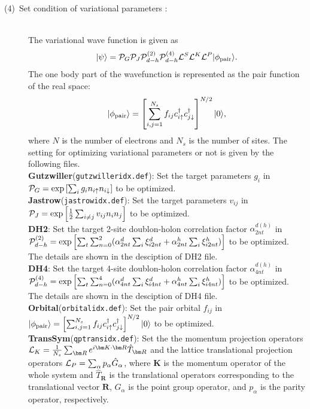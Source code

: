 \begin{description}
\item[(4)~Set condition of variational parameters :] 
~\\The variational wave function is given as
\begin{equation}
|\psi \rangle = {\cal P}_G{\cal P}_J{\cal P}_{d-h}^{(2)}{\cal P}_{d-h}^{(4)}{\cal L}^S{\cal L}^K{\cal L}^P |\phi_{\rm pair} \rangle.
\end{equation}
The one body part of the wavefunction is represented as the pair function of the real space:
\begin{equation}
|\phi_{\rm pair} \rangle = \left[\sum_{i, j=1}^{N_s} f_{ij}c_{i\uparrow}^{\dag}c_{j\downarrow}^{\dag} \right]^{N/2}|0 \rangle,
\end{equation}
where $N$ is the number of electrons and $N_s$ is the number of sites.
The setting for optimizing variational parameters or not is given by the following files.
~\\{\bf Gutzwiller}(\verb|gutzwilleridx.def|): Set the target parameters $g_i$ in\\
 ${\cal P}_G=\exp\left[ \sum_i g_i n_{i\uparrow} n_{i\downarrow} \right]$ to be optimized.
~\\{\bf Jastrow}(\verb|jastrowidx.def|): Set the target parameters $v_{ij}$ in\\
 ${\cal P}_J=\exp\left[\frac{1}{2} \sum_{i\neq j} v_{ij} n_i n_j\right]$ to be optimized.
~\\{\bf DH2}:  Set the target 2-site doublon-holon correlation factor $\alpha_{2nt}^{d(h)}$ in \\
${\cal P}_{d-h}^{(2)}= \exp \left[ \sum_t \sum_{n=0}^2 (\alpha_{2nt}^d \sum_{i}\xi_{i2nt}^d+\alpha_{2nt}^h \sum_{i}\xi_{i2nt}^h)\right]$ to be optimized. \\
The details are shown in the desciption of DH2 file.
~\\{\bf DH4}:  Set the target 4-site doublon-holon correlation factor $\alpha_{4nt}^{d(h)}$ in \\
${\cal P}_{d-h}^{(4)}= \exp \left[ \sum_t \sum_{n=0}^4 (\alpha_{4nt}^d \sum_{i}\xi_{i4nt}^d+\alpha_{4nt}^h \sum_{i}\xi_{i4nt}^h)\right]$ to be optimized.\\
The details are shown in the desciption of DH4 file.
~\\{\bf Orbital}(\verb|orbitalidx.def|): Set the pair orbital $f_{ij}$ in $|\phi_{\rm pair} \rangle = \left[\sum_{i, j=1}^{N_s} f_{ij}c_{i\uparrow}^{\dag}c_{j\downarrow}^{\dag} \right]^{N/2}|0 \rangle$ to be optimized.
~\\{\bf TransSym}(\verb|qptransidx.def|): Set the the momentum projection operators ${\cal L}_K=\frac{1}{N_s}\sum_{{\bm R}}e^{i {\bm K} \cdot{\bm R} } \hat{T}_{\bm R}$ and the lattice translational projection operators ${\cal L}_P=\sum_{\alpha}p_{\alpha} \hat{G}_{\alpha}$, where ${\bm K}$ is the momentum operator of the whole system and $\hat{T}_{\bm R}$ is the translational operators corresponding to the translational vector ${\bm R}$, $\hat{G}_{\alpha}$ is the point group operator, and $p_\alpha$ is the parity operator, respectively.


\end{description}
